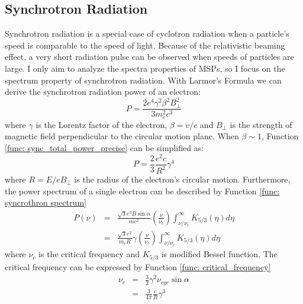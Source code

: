 \documentclass[12pt]{report}
\begin{document}
    \subsection{Synchrotron Radiation}
      Synchrotron radiation is a special case of cyclotron radiation when a particle's
      speed is comparable to the speed of light. Because of the relativistic beaming 
      effect, a very short radiation pulse can be observed when speeds of particles are
      large. I only aim to analyze the spectra properties of MSPs, so I focus on the 
      spectrum property of synchrotron radiation. 
      With Larmor's Formula we can derive the synchrotron radiation power of an electron:
      \begin{equation}
        \label{func: sync_total_power_precise}
        P = \frac{2e^4\gamma^2\beta^2B_{\perp}^2}{3m_e^2c^3} 
      \end{equation}
      where $\gamma$ is the Lorentz factor of the electron, $\beta=v/c$ and $B_{\perp}$ 
      is the strength of magnetic field perpendicular to the circular motion plane. 
      When $\beta \sim 1$, Function \ref{func: sync_total_power_precise} can be 
      simplified as:
      \begin{equation}
      \label{func: sync_total_power_simplified}
      P = \frac{2}{3}\frac{e^2c}{R^2}\gamma^4
      \end{equation}
      where $R = E / e B_{\perp}$ is the radius of the electron's circular motion. 
      Furthermore, the power spectrum of a single electron  
      can be described by Function \ref{func: syncrothron spectrum}
      \begin{eqnarray}
      \label{func: syncrothron spectrum}
        P\left(\nu\right) &=& \frac{\sqrt{3} e^3 B \sin{\alpha}}{m c^2} 
          \left(\frac{\nu}{\nu_c}\right) \int_{\nu / \nu_c}^{\infty} K_{5/3}\left(\eta \right)d\eta  \nonumber \\
          &=& \frac{\sqrt{3}e^2}{m_eR}\gamma \left(\frac{\nu}{\nu_c}\right) \int_{\nu / \nu_c}^{\infty} K_{5/3}\left(\eta \right)d\eta
      \end{eqnarray}
      where $\nu_c$ is the critical frequency and $K_{5/3}$ is modified Bessel function. 
      The critical frequency can be expressed by Function \ref{func: critical_frequency}
      \begin{eqnarray}
        \label{func: critical_frequency}
        \nu_c &=& \frac{3}{2} \gamma^2 \nu_{cyc} \sin{\alpha} \nonumber \\
              &=& \frac{3}{4\pi} \frac{c}{R} \gamma^3 
      \end{eqnarray} 
\end{document}
